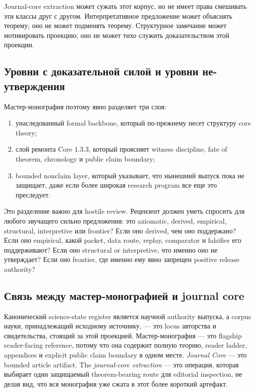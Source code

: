 Journal-core extraction может сужать этот корпус, но не имеет права
смешивать эти классы друг с другом.
Интерпретативное предложение может объяснять теорему; оно не может
подменять теорему.
Структурное замечание может мотивировать проекцию; оно не может
тихо служить доказательством этой проекции.

\subsection{Уровни с доказательной силой и уровни не-утверждения}

Мастер-монография поэтому явно разделяет три слоя:

\begin{enumerate}
\item унаследованный formal backbone, который по-прежнему несет структуру
      core theory;
\item слой ремонта Core 1.3.3, который проясняет witness discipline, fate of
      theorem, chronology и public claim boundary;
\item bounded nonclaim layer, который указывает, что нынешний выпуск пока
      не защищает, даже если более широкая research program все еще это
      преследует.
\end{enumerate}

Это разделение важно для hostile review.
Рецензент должен уметь спросить для любого звучащего сильно предложения:
это axiomatic, derived, empirical, structural, interpretive или frontier?
Если оно derived, чем оно поддержано?
Если оно empirical, какой packet, data route, replay, comparator и
falsifier его поддерживают?
Если оно structural or interpretive, что именно оно не утверждает?
Если оно frontier, где именно ему явно запрещен positive release authority?

\subsection{Связь между мастер-монографией и journal core}

Канонический science-state register является научной authority выпуска, а corpus науки,
принадлежащий исходному источнику, — это locus авторства и свидетельства,
стоящий за этой проекцией. Мастер-монография — это flagship reader-facing
reference, потому что она содержит полную теорию, reader ladder, appendices
и explicit public claim boundary в одном месте.
\emph{Journal Core} — это bounded article artifact. The
\emph{journal-core extraction} — это операция, которая выбирает один
защищаемый theorem-bearing route для editorial inspection, не делая вид, что
вся монография уже сжата в этот более короткий артефакт.

